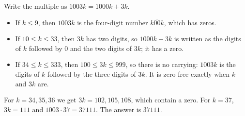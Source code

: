 Write the multiple as $1003k=1000k+3k$.
\begin{itemize}
\item If $k\le9$, then $1003k$ is the four-digit number $\overline{k00k}$, which has zeros.
\item If $10\le k\le33$, then $3k$ has two digits, so $1000k+3k$ is written as the digits of $k$ followed by $0$ and the two digits of $3k$; it has a zero.
\item If $34\le k\le333$, then $100\le3k\le999$, so there is no carrying: $1003k$ is the digits of $k$ followed by the three digits of $3k$. It is zero-free exactly when $k$ and $3k$ are.
\end{itemize}
For $k=34,35,36$ we get $3k=102,105,108$, which contain a zero. For $k=37$, $3k=111$ and $1003\cdot37=37111$. The answer is $\boxed{37111}$.

